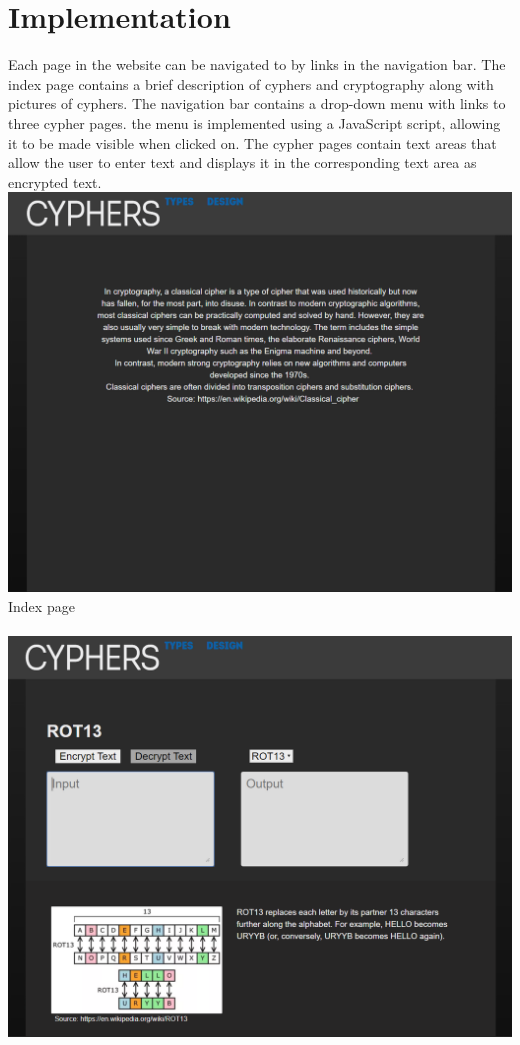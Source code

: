 \documentclass[10pt, a4paper]{article}
\begin{document}
	
	\section{Implementation}
	Each page in the website can be navigated to by links in the navigation bar. The index page contains a brief description of cyphers and cryptography along with pictures of cyphers. \cite{Affine} \cite{ROT13} \cite{Cyphers}
	The navigation bar contains a drop-down menu with links to three cypher pages. the menu is implemented using a JavaScript script, allowing it to be made visible when clicked on. The cypher pages contain text areas that allow the user to enter text and displays it in the corresponding text area as encrypted text.
	\\
	\includegraphics[scale=0.28]{index} 
	Index page
	\\\\
	\includegraphics[scale=0.28]{rot13}
\end{document}
